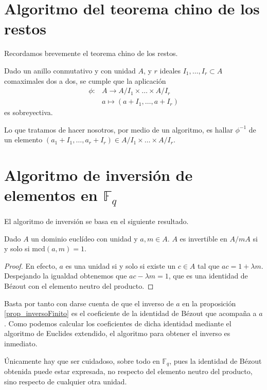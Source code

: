 \documentclass[a4paper, 11pt, twoside, notitlepage, openany, onecolumn, final]{report}
\begin{document}
	\section{Algoritmo del teorema chino de los restos}
	Recordamos brevemente el teorema chino de los restos.
	\begin{theo}
		Dado un anillo conmutativo y con unidad $A$, y $r$ ideales $I_1,\dots,I_r\subset A$ comaximales dos a dos, se cumple que la aplicación
		\begin{equation*}
			\begin{array}{cc}
			\phi:&A\to A/I_1\times\dots\times A/I_r\\
			& a\mapsto (a+I_1,\dots,a+I_r)
			\end{array}
		\end{equation*}
		es sobreyectiva.
	\end{theo}
	Lo que tratamos de hacer nosotros, por medio de un algoritmo, es hallar $\phi^{-1}$ de un elemento $(a_1+I_1,\dots,a_r+I_r)\in A/I_1\times\dots\times A/I_r$.
	\section{Algoritmo de inversión de elementos en $\mathbb{F}_q$}
	El algoritmo de inversión se basa en el siguiente resultado.
	\begin{prop}
		\label{prop_inversoFinito}
		Dado $A$ un dominio euclídeo con unidad y $a,m\in A$. $A$ es invertible en $A/mA$ si y solo si $\mathrm{mcd}(a,m)=1$.
	\end{prop}
	\begin{proof}
		En efecto, $a$ es una unidad si y solo si existe un $c\in A$ tal que $ac=1+\lambda m$. Despejando la igualdad obtenemos que $ac-\lambda m=1$, que es una identidad de Bézout con el elemento neutro del producto.
	\end{proof}
	Basta por tanto con darse cuenta de que el inverso de $a$ en la proposición \eqref{prop_inversoFinito} es el coeficiente de la identidad de Bézout que acompaña a $a$. Como podemos calcular los coeficientes de dicha identidad mediante el algoritmo de Euclides extendido, el algoritmo para obtener el inverso es inmediato.
	
	Únicamente hay que ser cuidadoso, sobre todo en $\mathbb{F}_q$, pues la identidad de Bézout obtenida puede estar expresada, no respecto del elemento neutro del producto, sino respecto de cualquier otra unidad.
	
\end{document}
